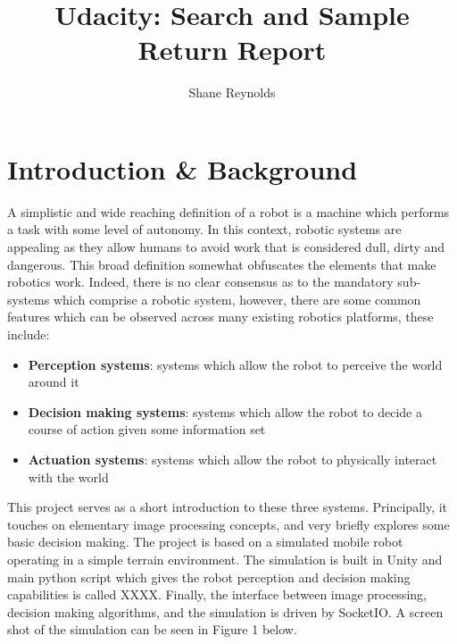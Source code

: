 \documentclass[a4paper]{article}
\begin{document}
\title{Udacity: Search and Sample Return Report}
\author{Shane Reynolds}
\maketitle
\section{Introduction \& Background}
A simplistic and wide reaching definition of a robot is a machine which performs a task with some level of autonomy. In this context, robotic systems are appealing as they allow humans to avoid work that is considered dull, dirty and dangerous. This broad definition somewhat obfuscates the elements that make robotics work. Indeed, there is no clear consensus as to the mandatory sub-systems which comprise a robotic system, however, there are some common features which can be observed across many existing robotics platforms, these include:
\begin{itemize}
\item \textbf{Perception systems}: systems which allow the robot to perceive the world around it
\item \textbf{Decision making systems}: systems which allow the robot to decide a course of action given some information set
\item \textbf{Actuation systems}: systems which allow the robot to physically interact with the world
\end{itemize}

This project serves as a short introduction to these three systems. Principally, it touches on elementary image processing concepts, and very briefly explores some basic decision making. The project is based on a simulated mobile robot operating in a simple terrain environment. The simulation is built in Unity and main python script which gives the robot perception and decision making capabilities is called XXXX. Finally, the interface between image processing, decision making algorithms, and the simulation is driven by SocketIO. A screen shot of the simulation can be seen in Figure 1 below.
\end{document}
